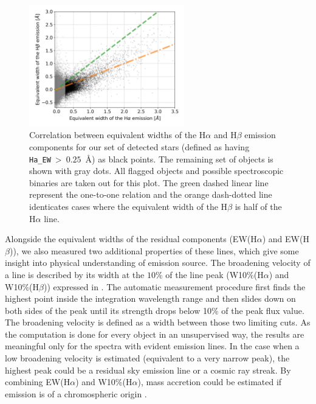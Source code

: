 \begin{figure}
	\centering
	\includegraphics[width=0.6\textwidth]{H_emission_EW_dist_all.png}
	\caption{Correlation between equivalent widths of the H$\alpha$ and H$\beta$ emission components for our set of detected stars (defined as having \texttt{Ha\_EW}~>~$0.25$~\AA) as black points. The remaining set of objects is shown with gray dots. All flagged objects and possible spectroscopic binaries are taken out for this plot. The green dashed linear line represent the one-to-one relation and the orange dash-dotted line identicates cases where the equivalent width of the H$\beta$ is half of the H$\alpha$ line.}
	\label{fig:hab_EW}
\end{figure}

Alongside the equivalent widths of the residual components (EW(H$\alpha$) and EW(H$\beta$)), we also measured two additional properties of these lines, which give some insight into physical understanding of emission source. The broadening velocity of a line is described by its width at the $10$\% of the line peak (W10\%(H$\alpha$) and W10\%(H$\beta$)) expressed in \kms. The automatic measurement procedure first finds the highest point inside the integration wavelength range and then slides down on both sides of the peak until its strength drops below 10\% of the peak flux value. The broadening velocity is defined as a width between those two limiting cuts. As the computation is done for every object in an unsupervised way, the results are meaningful only for the spectra with evident emission lines. In the case when a low broadening velocity is estimated (equivalent to a very narrow peak), the highest peak could be a residual sky emission line or a cosmic ray streak. By combining EW(H$\alpha$) and W10\%(H$\alpha$), mass accretion could be estimated if emission is of a chromospheric origin \cite{2015A&A...575A...4F}.

